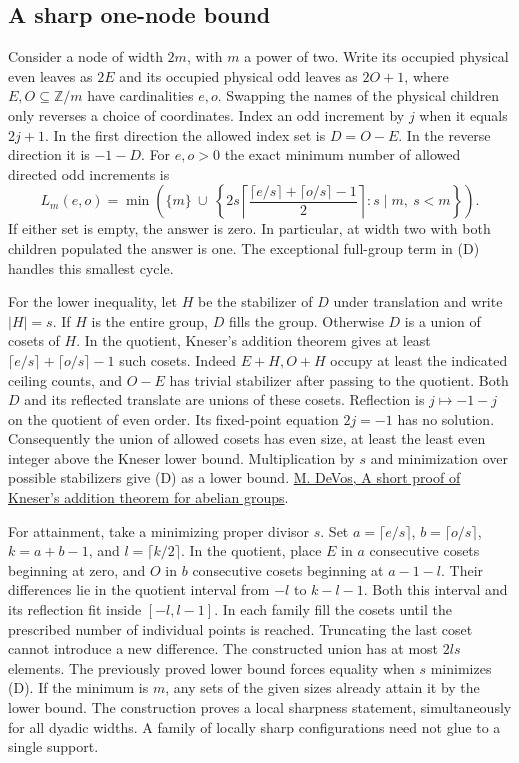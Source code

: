 \documentclass[12pt,letterpaper]{article}
\begin{document}
\subsection{A sharp one-node bound}
Consider a node of width \(2m\), with \(m\) a power of two. Write its occupied physical even leaves as \(2E\) and its occupied physical odd leaves as \(2O+1\), where \(E,O\subseteq\mathbb Z/m\) have cardinalities \(e,o\). Swapping the names of the physical children only reverses a choice of coordinates. Index an odd increment by \(j\) when it equals \(2j+1\). In the first direction the allowed index set is \(D=O-E\). In the reverse direction it is \(-1-D\). For \(e,o>0\) the exact minimum number of allowed directed odd increments is
\[
 L_m(e,o)=\min\!\left(\{m\}\ \cup\
 \left\{2s\left\lceil
 \frac{\lceil e/s\rceil+\lceil o/s\rceil-1}{2}\right\rceil:
             s\mid m,\ s<m\right\}\right).                  \tag{D}
\]
If either set is empty, the answer is zero. In particular, at width two with both children populated the answer is one. The exceptional full-group term in (D) handles this smallest cycle.

For the lower inequality, let \(H\) be the stabilizer of \(D\) under translation and write \(|H|=s\). If \(H\) is the entire group, \(D\) fills the group. Otherwise \(D\) is a union of cosets of \(H\). In the quotient, Kneser's addition theorem gives at least
\(\lceil e/s\rceil+\lceil o/s\rceil-1\) such cosets. Indeed \(E+H,O+H\) occupy at least the indicated ceiling counts, and \(O-E\) has trivial stabilizer after passing to the quotient. Both \(D\) and its reflected translate are unions of these cosets. Reflection is \(j\mapsto-1-j\) on the quotient of even order. Its fixed-point equation \(2j=-1\) has no solution. Consequently the union of allowed cosets has even size, at least the least even integer above the Kneser lower bound. Multiplication by \(s\) and minimization over possible stabilizers give (D) as a lower bound. \href{https://arxiv.org/abs/1303.3539}{M. DeVos, A short proof of Kneser's addition theorem for abelian groups}.

For attainment, take a minimizing proper divisor \(s\). Set \(a=\lceil e/s\rceil\), \(b=\lceil o/s\rceil\), \(k=a+b-1\), and \(l=\lceil k/2\rceil\). In the quotient, place \(E\) in \(a\) consecutive cosets beginning at zero, and \(O\) in \(b\) consecutive cosets beginning at \(a-1-l\). Their differences lie in the quotient interval from \(-l\) to \(k-l-1\). Both this interval and its reflection fit inside \([-l,l-1]\). In each family fill the cosets until the prescribed number of individual points is reached. Truncating the last coset cannot introduce a new difference. The constructed union has at most \(2ls\) elements. The previously proved lower bound forces equality when \(s\) minimizes (D). If the minimum is \(m\), any sets of the given sizes already attain it by the lower bound. The construction proves a local sharpness statement, simultaneously for all dyadic widths. A family of locally sharp configurations need not glue to a single support.
\end{document}
